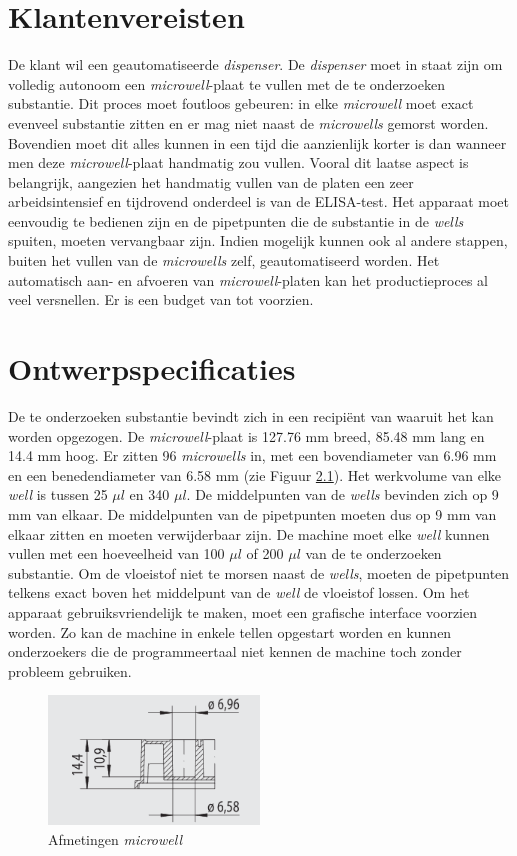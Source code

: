 \documentclass[a4paper,twoside,kulak]{kulakreport} %
\begin{document}
\chapter{Klantenvereisten}
De klant wil een geautomatiseerde \textit{dispenser}. De \textit{dispenser} moet in staat zijn om volledig autonoom een \textit{microwell}-plaat te vullen met de te onderzoeken substantie. Dit proces moet foutloos gebeuren: in elke \textit{microwell} moet exact evenveel substantie zitten en er mag niet naast de \textit{microwells} gemorst worden. Bovendien moet dit alles kunnen in een tijd die aanzienlijk korter is dan wanneer men deze \textit{microwell}-plaat handmatig zou vullen. Vooral dit laatse aspect is belangrijk, aangezien het handmatig vullen van de platen een zeer arbeidsintensief en tijdrovend onderdeel is van de ELISA-test. Het apparaat moet eenvoudig te bedienen zijn en de pipetpunten die de substantie in de \textit{wells} spuiten, moeten vervangbaar zijn.  Indien mogelijk kunnen ook al andere stappen, buiten het vullen van de \textit{microwells} zelf, geautomatiseerd worden. Het automatisch aan- en afvoeren van \textit{microwell}-platen kan het productieproces al veel versnellen. Er is een budget van  tot  voorzien.
\chapter{Ontwerpspecificaties}
De te onderzoeken substantie bevindt zich in een recipiënt van waaruit het kan worden opgezogen. De \textit{microwell}-plaat is 127.76 mm breed, 85.48 mm lang en 14.4 mm hoog. Er zitten 96 \textit{microwells} in, met een bovendiameter van 6.96 mm en een benedendiameter van 6.58 mm (zie Figuur \ref{fig: afmetingenMicrowellplaat}). Het werkvolume van elke \textit{well} is tussen 25 $\mu l$ en 340 $\mu l$. De middelpunten van de \textit{wells} bevinden zich op 9 mm van elkaar. De middelpunten van de pipetpunten moeten dus op 9 mm van elkaar zitten en moeten verwijderbaar zijn. De machine moet elke \textit{well} kunnen vullen met een hoeveelheid van 100 $\mu l$ of 200 $\mu l$ van de te onderzoeken substantie. Om de vloeistof niet te morsen naast de \textit{wells}, moeten de pipetpunten telkens exact boven het middelpunt van de \textit{well} de vloeistof lossen. Om het apparaat gebruiksvriendelijk te maken, moet een grafische interface voorzien worden. Zo kan de machine in enkele tellen opgestart worden en kunnen onderzoekers die de programmeertaal niet kennen de machine toch zonder probleem gebruiken.

\begin{figure}[h]
	\centering
	\includegraphics[width=0.5\textwidth]{AfmetingenMicrowell.png}
	\caption{Afmetingen \textit{microwell}}
	\label{fig: afmetingenMicrowellplaat}
	
\end{figure} 
\end{document}
